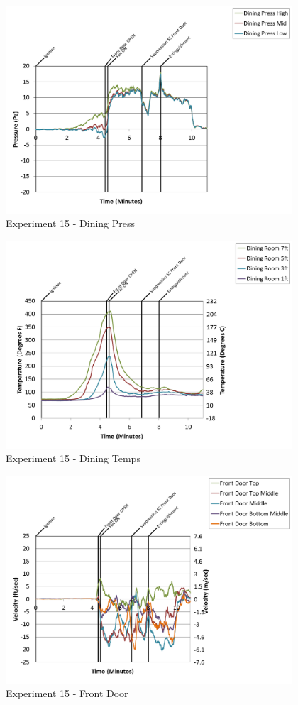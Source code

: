 \documentclass{article}
\begin{document}
\begin{appendices}
\begin{figure}[h!]
	\centering
	\includegraphics[height=3.05in]{0_Images/Results_Charts/Exp_15_Charts/DiningPress.png}
	\caption{Experiment 15 - Dining Press}
\end{figure}

\clearpage

\begin{figure}[h!]
	\centering
	\includegraphics[height=3.05in]{0_Images/Results_Charts/Exp_15_Charts/DiningTemps.png}
	\caption{Experiment 15 - Dining Temps}
\end{figure}


\begin{figure}[h!]
	\centering
	\includegraphics[height=3.05in]{0_Images/Results_Charts/Exp_15_Charts/FrontDoor.png}
	\caption{Experiment 15 - Front Door}
\end{figure}


\end{appendices}
\end{document}
